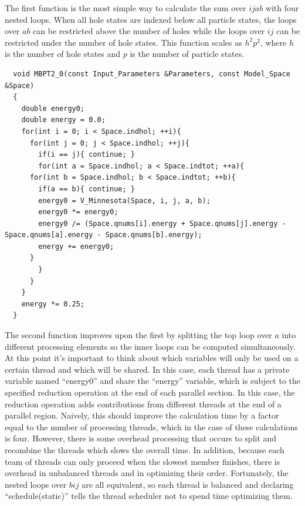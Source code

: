 The first function is the most simple way to calculate the sum over $ijab$ with four nested loops. When all hole states are indexed below all particle states, the loops over $ab$ can be restricted above the number of holes while the loops over $ij$ can be restricted under the number of hole states. This function scales as $h^2p^2$, where $h$ is the number of hole states and $p$ is the number of particle states.

\lstset{language=c++}
\begin{lstlisting}
  void MBPT2_0(const Input_Parameters &Parameters, const Model_Space &Space)
  {
    double energy0;
    double energy = 0.0;
    for(int i = 0; i < Space.indhol; ++i){
      for(int j = 0; j < Space.indhol; ++j){
        if(i == j){ continue; }
        for(int a = Space.indhol; a < Space.indtot; ++a){
	  for(int b = Space.indhol; b < Space.indtot; ++b){
	    if(a == b){ continue; }
	    energy0 = V_Minnesota(Space, i, j, a, b);
	    energy0 *= energy0;
	    energy0 /= (Space.qnums[i].energy + Space.qnums[j].energy - Space.qnums[a].energy - Space.qnums[b].energy);
	    energy += energy0;
	  }
        }
      }
    }
    energy *= 0.25;
  }
\end{lstlisting}

The second function improves upon the first by splitting the top loop over $a$ into different processing elements so the inner loops can be computed simultaneously. At this point it's important to think about which variables will only be used on a certain thread and which will be shared. In this case, each thread has a private variable named ``energy0'' and share the ``energy'' variable, which is subject to the specified reduction operation at the end of each parallel section. In this case, the reduction operation adds contributions from different threads at the end of a parallel region. Naively, this should improve the calculation time by a factor equal to the number of processing threads, which in the case of these calculations is four. However, there is some overhead processing that occurs to split and recombine the threads which slows the overall time. In addition, because each team of threads can only proceed when the slowest member finishes, there is overhead in unbalanced threads and in optimizing their order. Fortunately, the nested loops over $bij$ are all equivalent, so each thread is balanced and declaring ``schedule(static)'' tells the thread scheduler not to spend time optimizing them.

